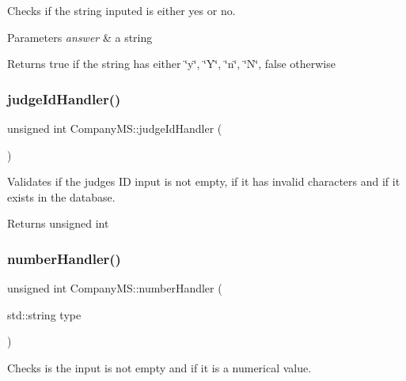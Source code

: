 Checks if the string inputed is either yes or no. 


\begin{DoxyParams}{Parameters}
{\em answer} & a string \\
\hline
\end{DoxyParams}
\begin{DoxyReturn}{Returns}
true if the string has either \char`\"{}y\char`\"{}, \char`\"{}\+Y\char`\"{}, \char`\"{}n\char`\"{}, \char`\"{}\+N\char`\"{}, false otherwise 
\end{DoxyReturn}
\mbox{\label{class_company_m_s_a6955c9821dccc668c367dedc5bc9515c}} 
\subsubsection{\texorpdfstring{judge\+Id\+Handler()}{judgeIdHandler()}}
{\footnotesize\ttfamily unsigned int Company\+M\+S\+::judge\+Id\+Handler (\begin{DoxyParamCaption}{ }\end{DoxyParamCaption})}



Validates if the judge\textquotesingle{}s ID input is not empty, if it has invalid characters and if it exists in the database. 

\begin{DoxyReturn}{Returns}
unsigned int 
\end{DoxyReturn}
\mbox{\label{class_company_m_s_ada3165bd9c22018019076e810efabfbb}} 
\subsubsection{\texorpdfstring{number\+Handler()}{numberHandler()}}
{\footnotesize\ttfamily unsigned int Company\+M\+S\+::number\+Handler (\begin{DoxyParamCaption}\item[{std\+::string}]{type }\end{DoxyParamCaption})}



Checks is the input is not empty and if it is a numerical value. 



